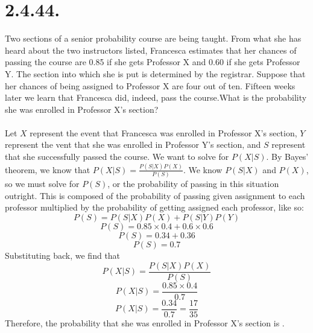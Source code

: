 \documentclass{article}
\begin{document}
{\section*{2.4.44.} 
Two sections of a senior probability course are being taught. From what she has heard about the two instructors listed, Francesca estimates that her chances of passing the course are 0.85 if she gets Professor X and 0.60 if she gets Professor Y. The section into which she is put is determined by the registrar. Suppose that her chances of being assigned to Professor X are four out of ten. Fifteen weeks later we learn that Francesca did, indeed, pass the course.What is the probability she was enrolled in Professor X's section?
\\ 
\\ 
Let \(X\) represent the event that Francesca was enrolled in Professor X's section, \(Y\) represent the vent that she was enrolled in Professor Y's section, and \(S\) represent that she successfully passed the course. We want to solve for \(P(X|S)\). By Bayes' theorem, we know that \(P(X|S) = \frac{P(S|X)P(X)}{P(S)}\). We know \(P(S|X)\) and \(P(X)\), so we must solve for \(P(S)\), or the probability of passing in this situation outright. This is composed of the probability of passing given assignment to each professor multiplied by the probability of getting assigned each professor, like so: \\ 
\[
P(S) = P(S|X)P(X) + P(S|Y)P(Y)
\]
\[
P(S) = 0.85 \times 0.4 + 0.6 \times 0.6
\tag*{As given}
\]
\[
P(S) = 0.34 + 0.36
\]
\[
P(S) = 0.7
\]
Substituting back, we find that \\
\[
P(X|S) = \frac{P(S|X)P(X)}{P(S)}
\]
\[
P(X|S) = \frac{0.85 \times 0.4}{0.7} 
\tag*{As determined}
\]
\[
P(X|S) = \frac{0.34}{0.7} = \frac{17}{35} 
\]
Therefore, the probability that she was enrolled in Professor X's section is .

}
\end{document}
